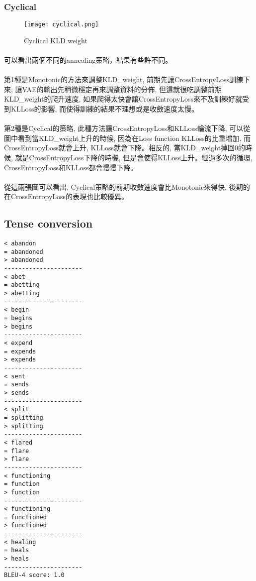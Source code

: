 \subsubsection{Cyclical}
\begin{figure}[!ht]
    \begin{center} 
        \texttt{[image: cyclical.png]}
        \caption{Cyclical KLD weight}
    \end{center} 
\end{figure}
\paragraph{}
可以看出兩個不同的annealing策略，結果有些許不同。
\paragraph{}
第1種是Monotonic的方法來調整KLD\_weight, 前期先讓CrossEntropyLoss訓練下來, 讓VAE的輸出先稍微穩定再來調整資料的分佈, 但這就很吃調整前期KLD\_weight的爬升速度, 如果爬得太快會讓CrossEntropyLoss來不及訓練好就受到KLLoss的影響, 而使得訓練的結果不理想或是收斂速度太慢。
\paragraph{}
第2種是Cyclical的策略, 此種方法讓CrossEntropyLoss和KLLoss輪流下降, 可以從圖中看到當KLD\_weight上升的時候, 因為在Loss function KLLoss的比重增加, 而CrossEntropyLoss就會上升, KLLoss就會下降。相反的, 當KLD\_weight掉回0的時候, 就是CrossEntropyLoss下降的時機, 但是會使得KLLoss上升。經過多次的循環, CrossEntropyLoss和KLLoss都會慢慢下降。
\paragraph{}
從這兩張圖可以看出, Cyclical策略的前期收斂速度會比Monotonic來得快, 後期的在CrossEntropyLoss的表現也比較優異。
\subsection{Tense conversion}
\begin{lstlisting}
< abandon
= abandoned
> abandoned
----------------------
< abet
= abetting
> abetting
----------------------
< begin
= begins
> begins
----------------------
< expend
= expends
> expends
----------------------
< sent
= sends
> sends
----------------------
< split
= splitting
> splitting
----------------------
< flared
= flare
> flare
----------------------
< functioning
= function
> function
----------------------
< functioning
= functioned
> functioned
----------------------
< healing
= heals
> heals
----------------------
BLEU-4 score: 1.0
\end{lstlisting}
